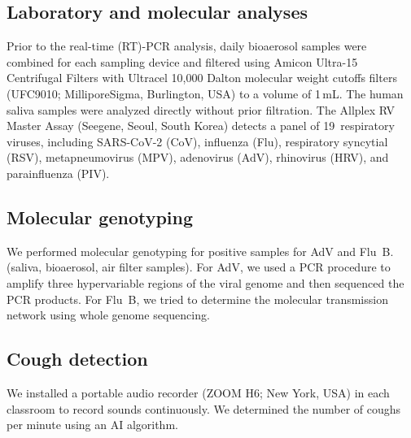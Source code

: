 \documentclass[fleqn,11pt]{wlscirep}
\begin{document}
\subsection{Laboratory and molecular analyses}\label{sec:mol_analyses}

\noindent Prior to the real-time (RT)-PCR analysis, daily bioaerosol samples were combined for each sampling device and filtered using Amicon Ultra-15 Centrifugal Filters with Ultracel 10,000 Dalton molecular weight cutoffs filters (UFC9010; MilliporeSigma, Burlington, USA) to a volume of 1\,mL. The human saliva samples were analyzed directly without prior filtration. The Allplex RV Master Assay (Seegene, Seoul, South Korea) detects a panel of 19~respiratory viruses, including SARS-CoV-2 (CoV), influenza (Flu), respiratory syncytial (RSV), metapneumovirus (MPV), adenovirus (AdV), rhinovirus (HRV), and parainfluenza (PIV). %

\subsection{Molecular genotyping}

We performed molecular genotyping for positive samples for AdV and Flu~B. (saliva, bioaerosol, air filter samples). For AdV, we used a PCR procedure to amplify three hypervariable regions of the viral genome and then sequenced the PCR products\cite{Akello2021SciRep}. For Flu~B, we tried to determine the molecular transmission network using whole genome sequencing\cite{Kelly2022FrontiersImmuno}.

\subsection{Cough detection}

We installed a portable audio recorder (ZOOM H6; New York, USA) in each classroom to record sounds continuously. We determined the number of coughs per minute using an AI algorithm\cite{Bertschinger2023IEEE}.
\end{document}
